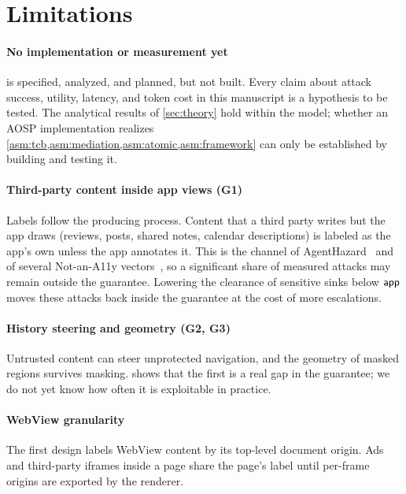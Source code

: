 \section{Limitations}\label{sec:limitations}

\paragraph{No implementation or measurement yet} \PG{} is specified, analyzed, and planned, but not built. Every claim about attack success, utility, latency, and token cost in this manuscript is a hypothesis to be tested. The analytical results of \cref{sec:theory} hold within the model; whether an AOSP implementation realizes \cref{asm:tcb,asm:mediation,asm:atomic,asm:framework} can only be established by building and testing it.

\paragraph{Third-party content inside app views (G1)} Labels follow the producing process. Content that a third party writes but the app draws (reviews, posts, shared notes, calendar descriptions) is labeled as the app's own unless the app annotates it. This is the channel of AgentHazard~\cite{liu2026agenthazard} and of several Not-an-A11y vectors~\cite{deivasigamani2026nota11y}, so a significant share of measured attacks may remain outside the guarantee. Lowering the clearance of sensitive sinks below $\textsf{app}$ moves these attacks back inside the guarantee at the cost of more escalations.

\paragraph{History steering and geometry (G2, G3)} Untrusted content can steer unprotected navigation, and the geometry of masked regions survives masking.  shows that the first is a real gap in the guarantee; we do not yet know how often it is exploitable in practice.

\paragraph{WebView granularity} The first design labels WebView content by its top-level document origin. Ads and third-party iframes inside a page share the page's label until per-frame origins are exported by the renderer.

